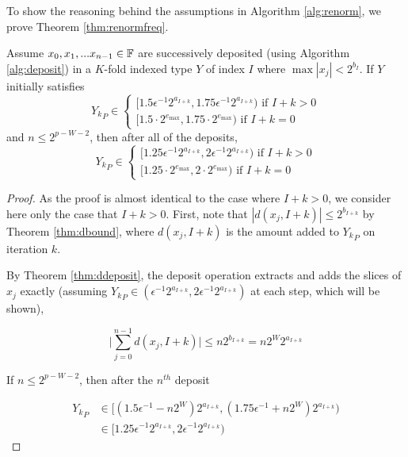     To show the reasoning behind the assumptions in Algorithm \ref{alg:renorm},
    we prove Theorem \ref{thm:renormfreq}.

      \begin{samepage}
    \begin{thm}
      Assume $x_0, x_1, ... x_{n - 1} \in \mathbb{F}$ are successively deposited (using Algorithm \ref{alg:deposit}) in a $K$-fold indexed type $Y$ of index $I$ where $\max|x_j| < 2^{b_I}$. If $Y$ initially satisfies
       \[
      {Y_k}_P \in \begin{cases}[1.5  \epsilon^{-1} 2^{a_{I + k}}, 1.75  \epsilon^{-1} 2^{a_{I + k}}) \text{ if } I + k > 0 \\ [1.5 \cdot 2^{e_{\max}}, 1.75 \cdot 2^{e_{\max}}) \text{ if } I + k = 0\end{cases}
      \]
       and $n \leq 2^{p - W - 2}$, then after all of the deposits, 
       \[
      {Y_k}_P \in \begin{cases}[1.25  \epsilon^{-1} 2^{a_{I + k}}, 2  \epsilon^{-1} 2^{a_{I + k}}) \text{ if } I + k > 0 \\ [1.25 \cdot 2^{e_{\max}}, 2 \cdot 2^{e_{\max}}) \text{ if } I + k = 0\end{cases}
      \]
      \label{thm:renormfreq}
    \end{thm}
    \end{samepage}

    \begin{proof}
    As the proof is almost identical to the case where $I + k > 0$, we consider here only the case that $I + k > 0$.
    First, note that $|d(x_j, I + k)| \leq 2^{b_{I + k}}$ by Theorem
    \ref{thm:dbound}, where $d(x_j, I + k)$ is the amount added to ${Y_k}_P$ on
    iteration $k$.

    By Theorem \ref{thm:ddeposit}, the deposit operation extracts and adds the slices of $x_j$ exactly (assuming ${Y_k}_P \in (\epsilon^{-1} 2^{a_{I + k}}, 2  \epsilon^{-1} 2^{a_{I + k}})$ at each step, which will be shown),

    \begin{equation*}
    \bigl|\sum \limits_{j = 0}^{n - 1} d(x_j, I + k)\bigr| \leq n  2^{b_{I + k}} = n  2^{W}  2^{a_{I + k}}
    \end{equation*}

    If $n \leq 2^{p - W - 2}$, then after the $n^{th}$ deposit

    \begin{align*}
    {Y_k}_P &\in \bigl[(1.5  \epsilon^{-1} - n  2^W) 2^{a_{I + k}}, (1.75  \epsilon^{-1} + n  2^W) 2^{a_{I + k}}\bigr) \\
    &\in [1.25  \epsilon^{-1} 2^{a_{I + k}}, 2  \epsilon^{-1} 2^{a_{I + k}})
    \end{align*}
    \end{proof}

